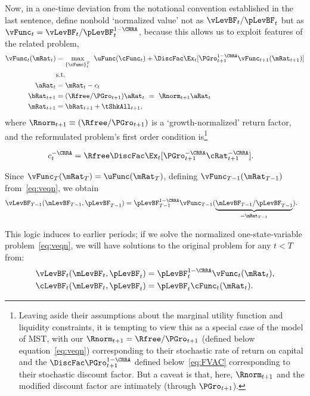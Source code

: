 \documentclass[BufferStockTheory]{subfiles}
\begin{document}
Now, in a one-time deviation from the notational convention established in the last sentence, define nonbold `normalized value' not as $\vLevBF_{t}/\pLevBF_{t}$ but as $\vFunc_{t} = \vLevBF_{t}/\pLevBF_{t}^{1-\CRRA}$, because this allows us to exploit features of the related problem,
\begin{align}
  \vFunc_{t}(\mRat_{t})  & = \max_{{\{\cFunc\}}_{t}^{T}}~  \uFunc(\cFunc_{t}) +\DiscFac \Ex_{t}[\PGro_{t+1}^{1-\CRRA}\vFunc_{t+1}({\mRat}_{t+1})] \notag \\
                         & \mbox{s.t.}  \label{eq:veqn}
  \\ {\aRat}_{t}  & = \mRat_{t}-c_{t}  \notag
  \\ {\bRat}_{t+1}  & = (\Rfree/\PGro_{t+1})\aRat_{t}  ~ = ~ \Rnorm_{t+1}\aRat_{t}  \notag
  \\ \mRat_{t+1}  & = \bRat_{t+1}+\tShkAll_{t+1}  \notag, %
\end{align}
where $\Rnorm_{t+1}\equiv (\Rfree/\PGro_{t+1})$ is a `growth-normalized' return factor, and the reformulated problem's first order condition is\footnote{Leaving aside their assumptions about the marginal utility function and liquidity constraints, it is tempting to view this as a special case of the model of MST, with our $\Rnorm_{t+1}=\Rfree/\PGro_{t+1}$ (defined below equation~\eqref{eq:veqn}) corresponding to their stochastic rate of return on capital and the {\FVAF} $\DiscFac \PGro_{t+1}^{1-\CRRA}$ defined below~\eqref{eq:FVAC} corresponding to their stochastic discount factor.  But a caveat is that, here, $\Rnorm_{t+1}$ and the modified discount factor are intimately (through $\PGro_{t+1}$).}

\begin{align}
  c_{t}^{-\CRRA}  & = \Rfree \DiscFac \Ex_{t}[ {\PGro}_{t+1}^{-\CRRA} {\cRat}
                    _{t+1}^{-\CRRA}].  \label{eq:scaledeuler}
\end{align}

Since $\vFunc_{T}(\mRat_{T}) = \uFunc(\mRat_{T})$, defining $\vFunc_{T-1}(\mRat_{T-1})$ from~\eqref{eq:veqn}, we obtain
\begin{align*}
  \vLevBF_{T-1}(\mLevBF_{T-1},\pLevBF_{T-1})  & = \pLevBF_{T-1}^{1-\CRRA} \vFunc_{T-1}(\underbrace{\mLevBF_{T-1}/\pLevBF_{T-1}}_{=\mRat_{T-1}}).
\end{align*}

This logic induces to earlier periods; if we solve the
normalized one-state-variable problem~\eqref{eq:veqn}, we
will have solutions to the original problem for any $t<T$
from:
\begin{align*}
  \vLevBF_{t}(\mLevBF_{t},\pLevBF_{t})  & = \pLevBF_{t}^{1-\CRRA}\vFunc_{t}(\mRat_{t}),
  \\ \cLevBF_{t}(\mLevBF_{t},\pLevBF_{t})  & = \pLevBF_{t}\cFunc_{t}(\mRat_{t}).
\end{align*}
\end{document}
